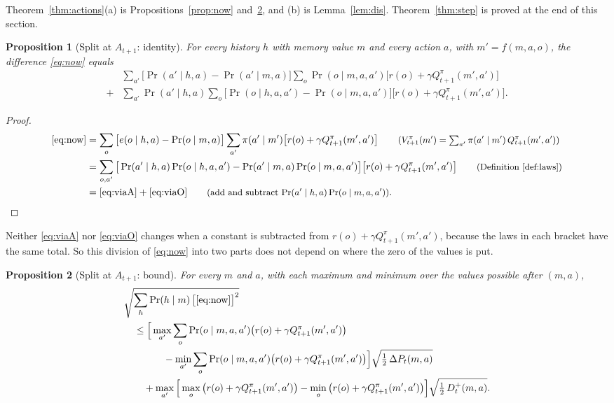\documentclass{article}
\newtheorem{proposition}{Proposition}[section]
\theoremstyle{definition}
\newcommand{\dP}{\Delta P}
\newcommand{\why}[1]{\tag*{\small(#1)}}
\begin{document}
Theorem~\ref{thm:actions}(a) is Propositions~\ref{prop:now} and~\ref{prop:bound2}, and (b) is Lemma~\ref{lem:dis}. Theorem~\ref{thm:step} is proved at the end of this section.

\begin{proposition}[Split at $A_{t+1}$: identity]\label{prop:id2}
For every history $h$ with memory value $m$ and every action $a$, with $m'=f(m,a,o)$, the difference \eqref{eq:now} equals
\begin{align}
&\sum_{a'}\big[\Pr(a'\mid h,a)-\Pr(a'\mid m,a)\big]\sum_o\Pr(o\mid m,a,a')\big[r(o)+\gamma Q^\pi_{t+1}(m',a')\big] \label{eq:viaA}\\
{}+{}&\sum_{a'}\Pr(a'\mid h,a)\sum_o\big[\Pr(o\mid h,a,a')-\Pr(o\mid m,a,a')\big]\big[r(o)+\gamma Q^\pi_{t+1}(m',a')\big]. \label{eq:viaO}
\end{align}
\end{proposition}

\begin{proof}
\begin{align*}
\eqref{eq:now}&=\sum_o\big[e(o\mid h,a)-\Pr(o\mid m,a)\big]\sum_{a'}\pi(a'\mid m')\big[r(o)+\gamma Q^\pi_{t+1}(m',a')\big] \why{$V^\pi_{t+1}(m')=\sum_{a'}\pi(a'\mid m')\,Q^\pi_{t+1}(m',a')$}\\
&=\sum_{o,a'}\big[\Pr(a'\mid h,a)\Pr(o\mid h,a,a')-\Pr(a'\mid m,a)\Pr(o\mid m,a,a')\big]\big[r(o)+\gamma Q^\pi_{t+1}(m',a')\big] \why{Definition~\ref{def:laws}}\\
&=\eqref{eq:viaA}+\eqref{eq:viaO} \why{add and subtract $\Pr(a'\mid h,a)\Pr(o\mid m,a,a')$}.
\end{align*}
\end{proof}

Neither \eqref{eq:viaA} nor \eqref{eq:viaO} changes when a constant is subtracted from $r(o)+\gamma Q^\pi_{t+1}(m',a')$, because the laws in each bracket have the same total. So this division of \eqref{eq:now} into two parts does not depend on where the zero of the values is put.

\begin{proposition}[Split at $A_{t+1}$: bound]\label{prop:bound2}
For every $m$ and $a$, with each maximum and minimum over the values possible after $(m,a)$,
\begin{align*}
&\sqrt{\sum_h\Pr(h\mid m)\,\big[\eqref{eq:now}\big]^2}\\
&\quad\le\Big[\max_{a'}\sum_o\Pr(o\mid m,a,a')\big(r(o)+\gamma Q^\pi_{t+1}(m',a')\big)\\
&\qquad\qquad-\min_{a'}\sum_o\Pr(o\mid m,a,a')\big(r(o)+\gamma Q^\pi_{t+1}(m',a')\big)\Big]\sqrt{\tfrac12\,\dP_t(m,a)}\\
&\qquad+\max_{a'}\Big[\max_o\big(r(o)+\gamma Q^\pi_{t+1}(m',a')\big)-\min_o\big(r(o)+\gamma Q^\pi_{t+1}(m',a')\big)\Big]\sqrt{\tfrac12\,D^+_t(m,a)}.
\end{align*}
\end{proposition}
\end{document}
